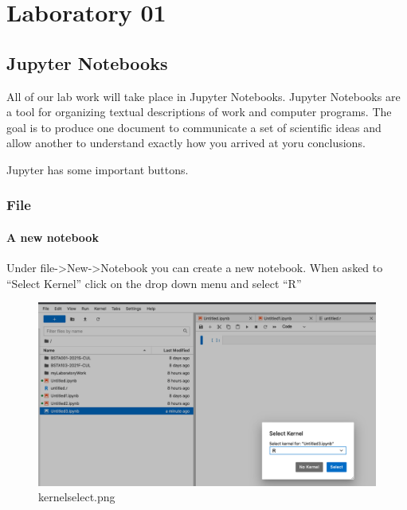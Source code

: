 

\chapter{Laboratory 01}
\hspace{1mm}
\hypertarget{jupyter-notebooks}{%
\section{Jupyter Notebooks}\label{jupyter-notebooks}}

All of our lab work will take place in Jupyter Notebooks. Jupyter
Notebooks are a tool for organizing textual descriptions of work and
computer programs. The goal is to produce one document to communicate a
set of scientific ideas and allow another to understand exactly how you
arrived at yoru conclusions.

Jupyter has some important buttons.

\hypertarget{file}{%
\subsection{File}\label{file}}

\hypertarget{a-new-notebook}{%
\subsubsection{A new notebook}\label{a-new-notebook}}

Under file-\textgreater New-\textgreater Notebook you can create a new
notebook. When asked to ``Select Kernel'' click on the drop down menu
and select ``R''

\begin{figure}
\centering
\includegraphics{chapters/chapter1/kernelselect}
\caption{kernelselect.png}
\end{figure}

